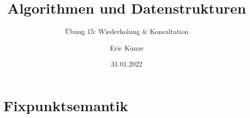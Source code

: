 \documentclass{beamer}
\begin{document}
	
	\title{Algorithmen und Datenstrukturen}
	\subtitle{Übung 15: Wiederholung \& Konsultation}
	\author{Eric Kunze}
	\date{31.01.2022}

	\maketitle


\section{Fixpunktsemantik}
\end{document}
